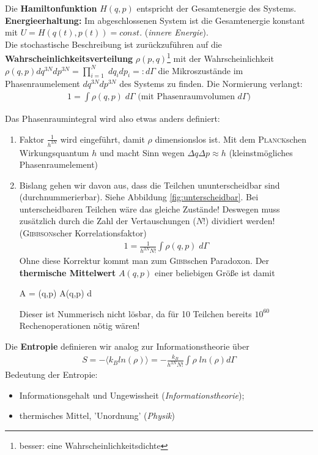 \documentclass[12pt]{article}
\begin{document}
Die \textbf{Hamiltonfunktion} $H(q,p)$ entspricht der Gesamtenergie des Systems. \textbf{Energieerhaltung:} Im abgeschlossenen System ist die Gesamtenergie konstant mit $U = H (q (t), p(t)) = const.$ (\textit{innere Energie}). \\
Die stochastische Beschreibung ist zurückzuführen auf die \textbf{Wahrscheinlichkeitsverteilung} $\rho (p,q)$\footnote{ besser: eine Wahrscheinlichkeitsdichte} mit der Wahrscheinlichkeit $\rho (q,p) dq^{3N} dp	^{3N}= \prod_{i=1}^{N} \; dq_i dp_i =: d\Gamma $  die Mikroszustände im Phasenraumelement $dq^{3N} dp^{3N} $ des Systems zu finden. Die Normierung verlangt: 
\begin{align}
1 = \int \rho (q,p) \; d\Gamma \mbox{ (mit Phasenraumvolumen } d\Gamma)
\end{align}

Das Phasenraumintegral wird also etwas anders definiert:
\begin{enumerate}
\item Faktor $\frac{1}{h^{3N}}$ wird eingeführt, damit $\rho $ dimensionslos ist. Mit dem \textsc{Planck}schen Wirkungsquantum $h$ und macht Sinn wegen $\Delta q \Delta p \approx h$ (kleinstmögliches Phasenraumelement)
\item Bislang gehen wir davon aus, dass die Teilchen ununterscheidbar sind (durchnummerierbar). Siehe Abbildung \ref{fig:unterscheidbar}. Bei unterscheidbaren Teilchen wäre das gleiche Zustände! Deswegen muss zusätzlich durch die Zahl der Vertauschungen ($N! $) dividiert werden! (\textsc{Gibbson}scher Korrelationsfaktor)
\begin{align}
1 = \frac{1}{h^{3N} N!} \int \rho (q,p)\;  d\Gamma
\end{align}
Ohne diese Korrektur kommt man zum \textsc{Gibb}schen Paradoxon. Der \textbf{thermische Mittelwert} $A(q,p)$ einer beliebigen Größe ist damit

\begin{tcolorbox}[ams gather,title= thermischer Mittelwert, colback=blue!10!white, colframe=blue!30!black] 
 \langle A \rangle =  \int \rho (q,p)\; A(q,p) \;  d\Gamma 
\end{tcolorbox}
Dieser ist Nummerisch nicht lösbar, da für 10 Teilchen bereits $10^{60}$ Rechenoperationen nötig wären! 
\end{enumerate}
Die \textbf{Entropie} definieren wir analog zur Informationstheorie über 
\begin{align}
S = - \langle k_B ln(\rho ) \rangle  = -\frac{k_B}{h^{3N} N!} \int \rho \; ln(\rho ) d\Gamma 
\end{align}
Bedeutung der Entropie: 
\begin{itemize}
\item Informationsgehalt und Ungewissheit (\textit{Informationstheorie});
\item  thermisches Mittel, 'Unordnung' (\textit{Physik})
\end{itemize}  
\end{document}
